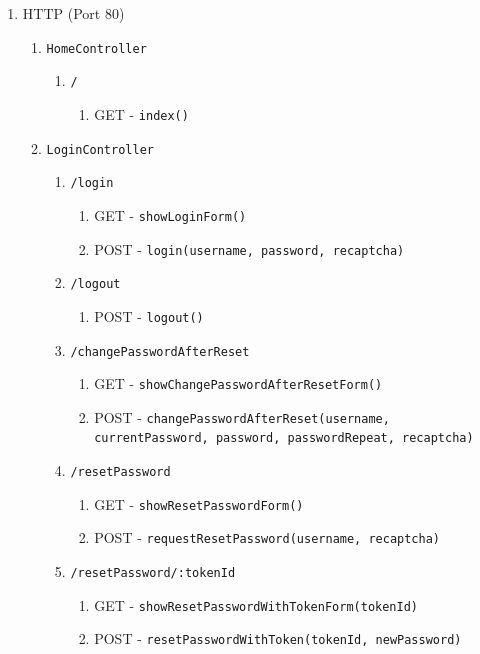 \documentclass[12pt,DIV14,BCOR10mm,a4paper,parskip=half-,headsepline,headinclude,english,ngerman,bibliography=totocnumbered]{scrreprt}
\begin{document}
\begin{enumerate}
  \item HTTP (Port 80)
  \begin{enumerate}
    \item \texttt{HomeController}
    \begin{enumerate}
     \item \texttt{/}
      \begin{enumerate}
        \item GET - \texttt{index()}
      \end{enumerate}
    \end{enumerate}

  \item \texttt{LoginController}
    \begin{enumerate}
     \item \texttt{/login}
      \begin{enumerate}
        \item GET - \texttt{showLoginForm()}
        \item POST - \texttt{login(username, password, recaptcha)}
      \end{enumerate}
      \item \texttt{/logout}
      \begin{enumerate}
        \item POST - \texttt{logout()}
      \end{enumerate}
      \item \texttt{/changePasswordAfterReset}
      \begin{enumerate}
        \item GET - \texttt{showChangePasswordAfterResetForm()}
        \item POST - \texttt{changePasswordAfterReset(username, currentPassword, password, passwordRepeat, recaptcha)}
      \end{enumerate}

      \item \texttt{/resetPassword}
      \begin{enumerate}
        \item GET - \texttt{showResetPasswordForm()}
        \item POST - \texttt{requestResetPassword(username, recaptcha)}
      \end{enumerate}

      \item \texttt{/resetPassword/:tokenId}
      \begin{enumerate}
        \item GET - \texttt{showResetPasswordWithTokenForm(tokenId)}
        \item POST - \texttt{resetPasswordWithToken(tokenId, newPassword)}
      \end{enumerate}
    \end{enumerate}


\end{enumerate}
\end{enumerate}
\end{document}
